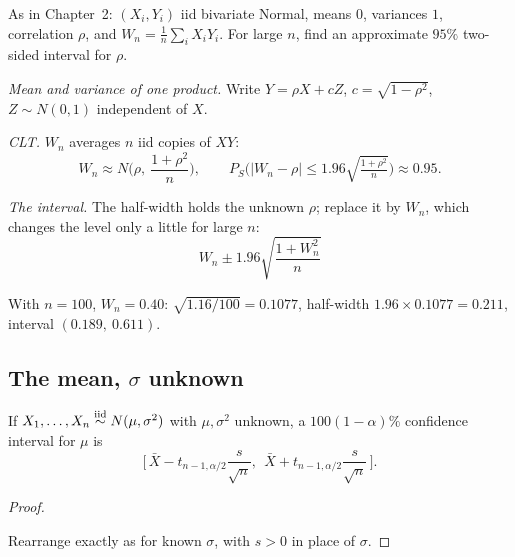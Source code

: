 \begin{example}
As in Chapter~2: $(X_i,Y_i)$ iid bivariate Normal, means $0$, variances $1$, correlation $\rho$, and $W_n=\frac1n\sum_iX_iY_i$. For large $n$, find an approximate $95\%$ two-sided interval for $\rho$.
\begin{steps}
  \item \emph{Mean and variance of one product.} Write $Y=\rho X+cZ$, $c=\sqrt{1-\rho^2}$, $Z\sim N(0,1)$ independent of $X$.
  \begin{deriv}
  \end{deriv}
  \item \emph{CLT.} $W_n$ averages $n$ iid copies of $XY$:
  \[
    W_n\approx N\Big(\rho,\ \frac{1+\rho^2}{n}\Big),\qquad P_S\Big(|W_n-\rho|\le1.96\sqrt{\tfrac{1+\rho^2}{n}}\Big)\approx0.95.
  \]
  \item \emph{The interval.} The half-width holds the unknown $\rho$; replace it by $W_n$, which changes the level only a little for large $n$:
  \[
    \boxed{\;W_n\pm1.96\sqrt{\frac{1+W_n^2}{n}}\;}
  \]
\end{steps}
With $n=100$, $W_n=0.40$: $\sqrt{1.16/100}=0.1077$, half-width $1.96\times0.1077=0.211$, interval $(0.189,\ 0.611)$.
\end{example}

\subsection*{The mean, $\sigma$ unknown}

\begin{theorem}
If $X_1,\dots,X_n\overset{\text{iid}}{\sim} N(\mu,\sigma^2)$ with $\mu,\sigma^2$ unknown, a $100(1-\alpha)\%$ confidence interval for $\mu$ is
\[
  \boxed{\;\Big[\,\bar X-t_{n-1,\alpha/2}\frac{s}{\sqrt n},\ \ \bar X+t_{n-1,\alpha/2}\frac{s}{\sqrt n}\,\Big].\;}
\]
\end{theorem}
\begin{proof}
\begin{deriv}
\end{deriv}
Rearrange exactly as for known $\sigma$, with $s>0$ in place of $\sigma$.
\end{proof}

